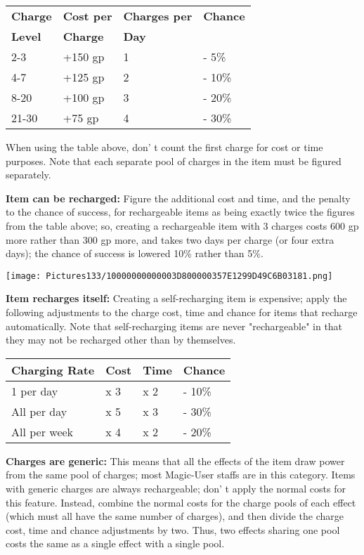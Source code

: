 \documentclass[a4paper,twoside,openany,10pt]{book}
\begin{document}
\begin{multicols}{2}
\begin{tabular*}{0.93\linewidth}{@{\extracolsep{\fill}}llll}
\textbf{Charge} & \textbf{Cost per} & \textbf{Charges per} & \textbf{Chance} \\
\textbf{Level} & \textbf{Charge} & \textbf{Day} &  \\\toprule
2-3 & +150 gp & 1 & - 5\% \\\hline
4-7 & +125 gp & 2 & - 10\% \\\hline
8-20 & +100 gp & 3 & - 20\% \\\hline
21-30 & +75 gp & 4 & - 30\% \\\bottomrule
\end{tabular*}\medskip

When using the table above, don' t count the first charge for cost or time purposes. Note that each separate pool of charges in the item must be figured separately.

\textbf{Item can be recharged:} Figure the additional cost and time, and the penalty to the chance of success, for rechargeable items as being exactly twice the figures from the table above; so, creating a rechargeable item with 3 charges costs 600 gp more rather than 300 gp more, and takes two days per charge (or four extra days); the chance of success is lowered 10\% rather than 5\%.

\begin{center}
	\texttt{[image: Pictures133/10000000000003D800000357E1299D49C6B03181.png]}
\end{center}

\textbf{Item recharges itself:} Creating a self-recharging item is expensive; apply the following adjustments to the charge cost, time and chance for items that recharge automatically. Note that self-recharging items are never "rechargeable" in that they may not be recharged other than by themselves.\medskip

\begin{tabular*}{0.93\linewidth}{@{\extracolsep{\fill}}llll}

\textbf{Charging Rate} & \textbf{Cost} & \textbf{Time} & \textbf{Chance} \\\toprule
1 per day & x 3 & x 2 & - 10\% \\\hline
All per day & x 5 & x 3 & - 30\% \\\hline
All per week & x 4 & x 2 & - 20\% \\\bottomrule
\end{tabular*}\medskip

\textbf{Charges are generic:} This means that all the effects of the item draw power from the same pool of charges; most Magic-User staffs are in this category. Items with generic charges are always rechargeable; don' t apply the normal costs for this feature. Instead, combine the normal costs for the charge pools of each effect (which must all have the same number of charges), and then divide the charge cost, time and chance adjustments by two. Thus, two effects sharing one pool costs the same as a single effect with a single pool. 


\end{multicols}
\end{document}
